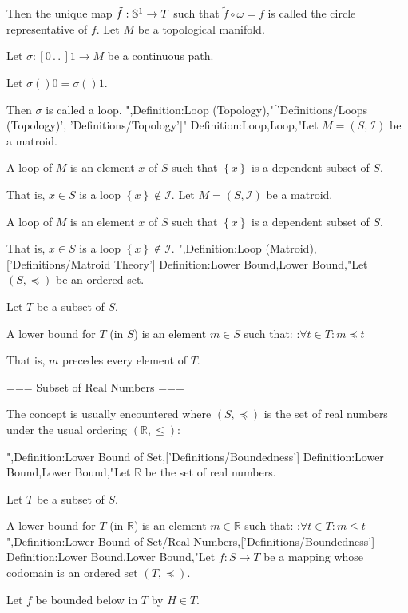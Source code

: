 Then the unique map $\tilde f : \Bbb S^1 \to T$ such that $\tilde f \circ \omega = f$ is called the circle representative of $f$.
Let $M$ be a topological manifold.

Let $\sigma : \left[ 0 \,.\,.\,   \right]1 \to M$ be a continuous path.

Let $\sigma \left(   \right)0 = \sigma \left(   \right)1$.


Then $\sigma$ is called a loop.
",Definition:Loop (Topology),"['Definitions/Loops (Topology)', 'Definitions/Topology']"
Definition:Loop,Loop,"Let $M = \left( S, \mathscr I \right)$ be a matroid.


A loop of $M$ is an element $x$ of $S$ such that $\left\lbrace x \right\rbrace$ is a dependent subset of $S$.

That is, $x \in S$ is a loop  $\left\lbrace x \right\rbrace \not \in \mathscr I$.
Let $M = \left( S, \mathscr I \right)$ be a matroid.


A loop of $M$ is an element $x$ of $S$ such that $\left\lbrace x \right\rbrace$ is a dependent subset of $S$.

That is, $x \in S$ is a loop  $\left\lbrace x \right\rbrace \not \in \mathscr I$.
",Definition:Loop (Matroid),['Definitions/Matroid Theory']
Definition:Lower Bound,Lower Bound,"Let $\left( S, \preceq \right)$ be an ordered set.

Let $T$ be a subset of $S$.


A lower bound for $T$ (in $S$) is an element $m \in S$ such that:
:$\forall t \in T: m \preceq t$

That is, $m$ precedes every element of $T$.


=== Subset of Real Numbers ===

The concept is usually encountered where $\left( S, \preceq \right)$ is the set of real numbers under the usual ordering $\left( \mathbb R, \le \right)$:

",Definition:Lower Bound of Set,['Definitions/Boundedness']
Definition:Lower Bound,Lower Bound,"Let $\mathbb R$ be the set of real numbers.

Let $T$ be a subset of $S$.


A lower bound for $T$ (in $\mathbb R$) is an element $m \in \mathbb R$ such that:
:$\forall t \in T: m \le t$",Definition:Lower Bound of Set/Real Numbers,['Definitions/Boundedness']
Definition:Lower Bound,Lower Bound,"Let $f: S \to T$ be a mapping whose codomain is an ordered set $\left( T, \preceq \right)$.


Let $f$ be bounded below in $T$ by $H \in T$.



